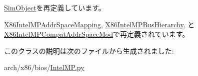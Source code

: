\hyperlink{classm5_1_1SimObject_1_1SimObject_acce15679d830831b0bbe8ebc2a60b2ca}{SimObject}を再定義しています。

\hyperlink{classIntelMP_1_1X86IntelMPAddrSpaceMapping_acce15679d830831b0bbe8ebc2a60b2ca}{X86IntelMPAddrSpaceMapping}, \hyperlink{classIntelMP_1_1X86IntelMPBusHierarchy_acce15679d830831b0bbe8ebc2a60b2ca}{X86IntelMPBusHierarchy}, と \hyperlink{classIntelMP_1_1X86IntelMPCompatAddrSpaceMod_acce15679d830831b0bbe8ebc2a60b2ca}{X86IntelMPCompatAddrSpaceMod}で再定義されています。

このクラスの説明は次のファイルから生成されました:\begin{DoxyCompactItemize}
\item 
arch/x86/bios/\hyperlink{IntelMP_8py}{IntelMP.py}\end{DoxyCompactItemize}
